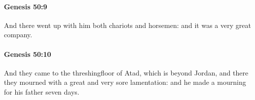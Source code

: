 		\paragraph{Genesis 50:9} %
			\label{GENESIS-50-9}

			And there went up with him both chariots and horsemen: and it was a very great company.


		\paragraph{Genesis 50:10} %
			\label{GENESIS-50-10}

			And they came to the threshingfloor of Atad, which is beyond Jordan, and there they mourned with a great and very sore lamentation: and he made a mourning for his father seven days.


